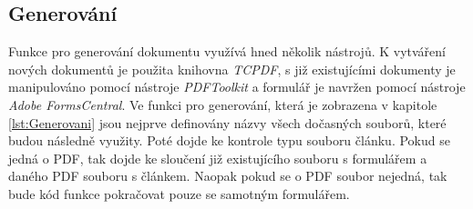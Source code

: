 \documentclass[czech,BP]{thesiskiv}
\begin{document}
\subsection{Generování}
Funkce pro generování dokumentu využívá hned několik nástrojů. K vytváření nových dokumentů je použita knihovna \emph{TCPDF}, s již existujícími dokumenty je manipulováno pomocí nástroje \emph{PDFToolkit} a formulář je navržen pomocí nástroje \emph{Adobe FormsCentral}. 
Ve funkci pro generování, která je zobrazena v kapitole \ref{lst:Generovani} jsou nejprve definovány názvy všech dočasných souborů, které budou následně využity. Poté dojde ke kontrole typu souboru článku. Pokud se jedná o PDF, tak dojde ke sloučení již existujícího souboru s formulářem a daného PDF souboru s článkem. Naopak pokud se o PDF soubor nejedná, tak bude kód funkce pokračovat pouze se samotným formulářem.
\end{document}
